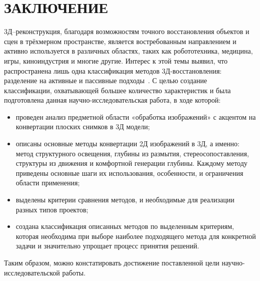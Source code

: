 \chapter*{ЗАКЛЮЧЕНИЕ}

3Д--реконструкция, благодаря возможностям точного восстановления объектов и сцен в трёхмерном пространстве,
является востребованным направлением и активно используется в различных областях,
таких как робототехника, медицина, игры, киноиндустрия и многие другие.
Интерес к этой темы выявил, что распространена лишь одна классификация методов 3Д-восстановления:
разделение на активные и пассивные подходы~\cite{stereosop2, sfm, structLight, ref1}.
С целью создание классификации, охватывающей большее количество характеристик и
была подготовлена данная научно-исследовательская работа, в ходе которой:

\begin{itemize}
    \item проведен анализ предметной области «обработка изображений» с акцентом на конвертации плоских снимков в 3Д модели;
    \item описаны основные методы конвертации 2Д изображений в 3Д, а именно: метод структурного освещения, глубины из размытия, стереосопоставления, структуры из движения и комфортной генерации глубины. Каждому методу приведены основные шаги их использования, особенности, и ограничения области применения;
    \item выделены критерии сравнения методов, и необходимые для реализации разных типов проектов;
    \item создана классификация описанных методов по выделенным критериям, которая необходима при выборе наиболее подходящего метода для конкретной задачи и значительно упрощает процесс принятия решений.
\end{itemize}
Таким образом, можно констатировать достижение поставленной цели научно-исследовательской работы.

 

 

